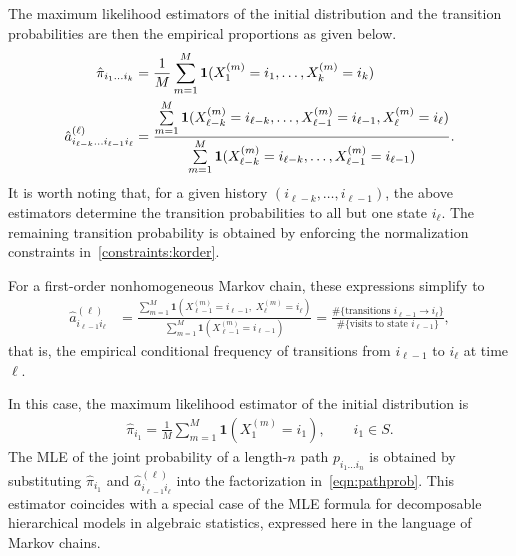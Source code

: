 \documentclass[11pt, a4paper]{article}
\numberwithin{equation}{section}
\theoremstyle{plain}
\theoremstyle{definition}
\begin{document}
The maximum likelihood estimators of the initial distribution and the transition probabilities are then the empirical proportions as given below.
\begin{align}
    \hat{\pi}_{i_1 \dots i_k} & = \frac{1}{M} \sum\limits_{m=1}^M  {\bf 1}( 
    X_{1}^{(m)} = i_1, \dots, X_k^{(m)} = i_k)  \nonumber \\
    \hat{a}_{i_{\ell-k}\dots i_{\ell-1} i_\ell}^{(\ell)} & = \frac{\sum\limits_{m=1}^M  {\bf 1}( 
    X_{\ell-k}^{(m)} = i_{\ell-k}, \dots, X_{\ell-1}^{(m)} = i_{\ell-1}, X_{\ell}^{(m)} = i_\ell)}{\sum\limits_{m=1}^M  {\bf 1}( 
    X_{\ell-k}^{(m)} = i_{\ell-k}, \dots, X_{\ell-1}^{(m)} = i_{\ell-1})}. \label{eqn:knhMCTP}
\end{align}
It is worth noting that, for a given history $(i_{\ell-k},\dots,i_{\ell-1})$, the above estimators determine
the transition probabilities to all but one state $i_\ell$. The remaining transition probability is 
obtained by enforcing the normalization constraints in~\eqref{constraints:korder}.

For a first-order nonhomogeneous Markov chain, these expressions simplify to
\begin{align}
\hat{a}^{(\ell)}_{i_{\ell-1} i_\ell}
&=
\frac{\sum_{m=1}^M \mathbf{1}\!\left(
X^{(m)}_{\ell-1}= i_{\ell-1},\;
X^{(m)}_{\ell}= i_\ell
\right)}
{\sum_{m=1}^M \mathbf{1}\!\left(
X^{(m)}_{\ell-1}= i_{\ell-1}
\right)}
=
\frac{\#\{\text{transitions } i_{\ell-1}\to i_\ell\}}
{\#\{\text{visits to state } i_{\ell-1}\}},
\label{eqn:1nhMCTP}
\end{align}
that is, the empirical conditional frequency of transitions from $i_{\ell-1}$ to $i_\ell$ at time $\ell$.

In this case, the maximum likelihood estimator of the initial distribution is
\begin{align}
\hat{\pi}_{i_1}
=
\frac{1}{M}\sum_{m=1}^M \mathbf{1}\!\left(X^{(m)}_1=i_1\right),
\qquad i_1\in S.
\label{eqn:1nhMCinitial}
\end{align}
The MLE of the joint probability of a length-$n$ path $p_{i_1\dots i_n}$ is obtained by substituting
$\hat{\pi}_{i_1}$ and $\hat{a}^{(\ell)}_{i_{\ell-1}i_\ell}$ into the factorization in~\eqref{eqn:pathprob}.
This estimator coincides with a special case of the MLE formula for decomposable hierarchical models
in algebraic statistics, expressed here in the language of Markov chains.
\end{document}
